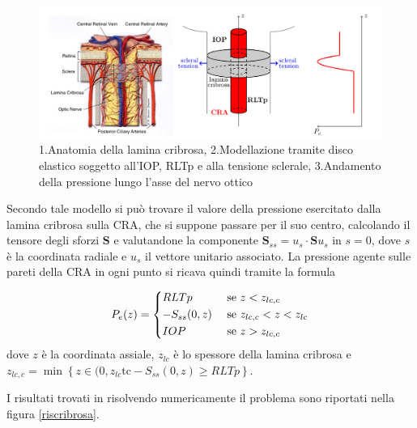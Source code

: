 \documentclass{article}
\begin{document}
\begin{figure}[h]
\begin{center}
\includegraphics[width=1.0\textwidth]{Pictures/laminacribrosa.png}
\caption{1.Anatomia della lamina cribrosa, 2.Modellazione tramite disco elastico soggetto all'IOP, RLTp e alla tensione sclerale, 3.Andamento della pressione lungo l'asse del nervo ottico \cite{art3}}
\label{laminacribrosa}
\end{center}
\end{figure}

Secondo tale modello si può trovare il valore della pressione esercitato dalla lamina cribrosa sulla CRA, che si suppone passare per il suo centro, calcolando il tensore degli sforzi $\mathbf{S}$ e valutandone la componente $\mathbf{S}_{ss} = u_s \cdot \mathbf{S} u_s$ in $s = 0$, dove $s$ è la coordinata radiale e $u_s$ il vettore unitario associato.
La pressione agente sulle pareti della CRA in ogni punto si ricava quindi tramite la formula

\begin{equation}
P_e(z) = \begin{dcases}
RLTp & \mbox{  se  }  z < z_{lc,c}\\ 
-S_{ss}(0,z) & \mbox{  se  }  z_{lc,c} < z < z_{lc}\\ 
IOP & \mbox{  se  }  z > z_{lc,c}
\end{dcases}
\label{cribrosa_alt}
\end{equation}
dove $z$ è la coordinata assiale, $z_{lc}$ è lo spessore della lamina cribrosa e $z_{lc,c} = \min\left\lbrace z \in (0,z_{lc} \mbox{tc} -S_{ss}(0,z) \geq RLTp\right\rbrace$.

I risultati trovati in \cite{art3} risolvendo numericamente il problema sono riportati nella figura \ref{riscribrosa}.
\end{document}
